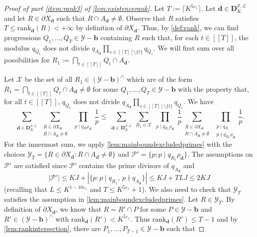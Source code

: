 \documentclass[11pt]{amsart}
\theoremstyle{definition}
\renewcommand{\leq}{\leqslant}
\newcommand{\sinterval}[1]{[\![#1]\!] }
\newcommand{\abs}[1]{\left|#1\right|}
\newcommand{\eps}{\varepsilon}
\newcommand{\rank}{\mathrm{rank}_{\d}}
\newcommand{\primes}{\mathcal{P}}
\renewcommand{\d}{\boldsymbol{d}}
\newcommand{\cstH}{\eps_1}
\newcommand{\rankcutoff}{\repK^{5\cstH}}
\newcommand{\boundelln}{\repK^{1-10\cstH}}
\newcommand{\sommespart}{b}
\newcommand{\fprod}[1]{\rho_{#1}}
\newcommand{\pall}{\fprod{\d}}
\newcommand{\progression}{A_{\d}}
\newcommand{\lit}{\mathcal{L}}
\newcommand{\s}{\mathcal{S}}
\newcommand{\fancyD}{\mathbf{D}}
\newcommand{\Dss}{\fancyD^{\s,\lit}_{\!\repK}}
\newcommand{\elln}{L}
\renewcommand{\vec}{\boldsymbol}
\newcommand{\prohibprog}{\mathcal{Y}}
\newcommand{\modulus}{q}
\newcommand{\Xd}{X_{\d}}
\newcommand{\repR}{J}
\newcommand{\repK}{K}
\newcommand{\sofprog}{\mathcal{Y}_{\ncond}}
\newcommand{\shiftedprog}{\prohibprog-\vec{\sommespart}}
\newcommand{\interprog}{(\shiftedprog)^{\cap}}
\newcommand{\ncond}{T}
\newcommand{\sset}{\primes'}
\begin{document}
\begin{proof}[Proof of part \cref{item:rank3} of \cref{lem:existencerank}]
Let $\ncond := \lceil \rankcutoff \rceil$. Let $\d \in \Dss$ and let $R\in \partial \Xd$ such that ${R\cap \progression \neq \emptyset}$. Observe that $R$ satisfies $\ncond \leq \rank(R) <+\infty$ by definition of $\partial \Xd$. Thus, by \cref{def:rank}, we can find progressions $Q_1, \ldots, Q_{\ncond}\in \shiftedprog$ containing $R$ such that, for each $t\in \sinterval{\ncond}$, the modulus $\modulus_{Q_t}$ does not divide $\modulus_{\progression}\prod_{s\in \sinterval{\ncond}\setminus \{t\}}\modulus_{Q_s}$. We will first sum over all possibilities for ${R_1 := \bigcap_{t\in \sinterval{\ncond}} Q_t \cap \progression}$.

Let $\mathcal{X}$ be the set of all $R_1\in \interprog$ which are of the form $R_1 = \bigcap_{t\in \sinterval{\ncond}} Q_t \cap \progression \neq \emptyset$ for some ${Q_1, \ldots, Q_{\ncond}\in \shiftedprog}$ with the property that, for all $t\in \sinterval{\ncond}$, $\modulus_{Q_t}$ does not divide $\modulus_{\progression}\prod_{s\in \sinterval{\ncond}\setminus \{t\}}\modulus_{Q_s}$. We have
\begin{equation*}
	 \sum_{\substack{\d\in \Dss}} \sum_{\substack{R\in \partial\Xd \\ R\cap \progression \neq \emptyset}}\, \prod_{\substack{p\mid \modulus_{R} \pall}}\frac{1}{p} \leq  \sum_{\substack{\d\in \Dss}} \sum_{R_1\in \mathcal{X}}  \prod_{\substack{p\mid \modulus_{R_1}\! \pall}}\frac{1}{p} \sum_{\substack{R\in \partial\Xd \\ R\cap \progression \neq \emptyset}}\, \prod_{\substack{p\mid \modulus_{R}\\ p\nmid \modulus_{R_1}\! \pall}}\frac{1}{p}.
\end{equation*}
For the innermost sum, we apply \cref{lem:mainboundexcludedprimes} with the choices $\sofprog = \{R\in \partial \Xd : R\cap \progression \neq \emptyset\}$ and ${\sset = \{p:p\mid \modulus_{R_1} \pall\}}$. The assumptions on $\sset$ are satisfied since $\sset$ contains the prime divisors of $\modulus_{\progression}$ and 
\begin{equation*}
	\abs{\sset} \leq \repK\repR + \abs{\{p : p\mid \modulus_{R_1}, \, p\nmid \modulus_{\progression}\}}\leq \repK\repR +  \ncond \elln \repR \leq 2\repK\repR
\end{equation*}
(recalling that $\elln \leq \boundelln$ and $\ncond \leq \rankcutoff+1$).
We also need to check that $\sofprog$ satisfies the assumption in \cref{lem:mainboundexcludedprimes}. Let $R\in \sofprog$. By definition of $\partial \Xd$, we know that $R = R' \cap P$ for some $P\in \shiftedprog$ and $R'\in \interprog$ with $\rank(R') < \rankcutoff$. Thus $\rank(R')\leq \ncond-1$ and by \cref{lem:rankintersection}, there are $P_1, \ldots, P_{\ncond-1}\in \shiftedprog$ such that 

\end{proof}
\end{document}
